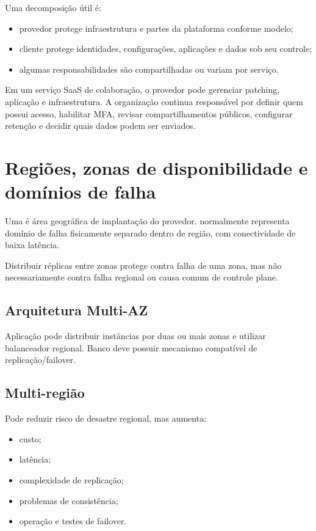 Uma decomposição útil é:
\begin{itemize}
\item provedor protege infraestrutura e partes da plataforma conforme modelo;
\item cliente protege identidades, configurações, aplicações e dados sob seu controle;
\item algumas responsabilidades são compartilhadas ou variam por serviço.
\end{itemize}

\begin{exemplo}[SaaS]
Em um serviço SaaS de colaboração, o provedor pode gerenciar patching, aplicação e infraestrutura. A organização continua responsável por definir quem possui acesso, habilitar MFA, revisar compartilhamentos públicos, configurar retenção e decidir quais dados podem ser enviados.
\end{exemplo}

\section{Regiões, zonas de disponibilidade e domínios de falha}

Uma  é área geográfica de implantação do provedor.  normalmente representa domínio de falha fisicamente separado dentro de região, com conectividade de baixa latência.

Distribuir réplicas entre zonas protege contra falha de uma zona, mas não necessariamente contra falha regional ou causa comum de controle plane.

\subsection{Arquitetura Multi-AZ}

Aplicação pode distribuir instâncias por duas ou mais zonas e utilizar balanceador regional. Banco deve possuir mecanismo compatível de replicação/failover.

\subsection{Multi-região}

Pode reduzir risco de desastre regional, mas aumenta:
\begin{itemize}
\item custo;
\item latência;
\item complexidade de replicação;
\item problemas de consistência;
\item operação e testes de failover.
\end{itemize}

